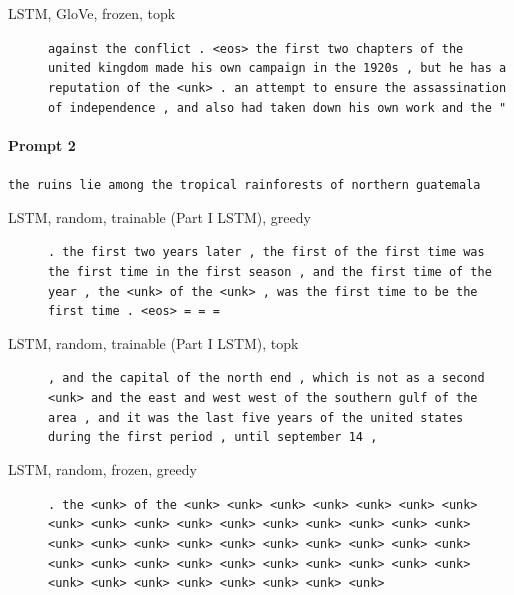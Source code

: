 \begin{description}
\item[LSTM, GloVe, frozen, topk] \texttt{\small against the conflict . \textless{}eos\textgreater{} the first two chapters of the united kingdom made his own campaign in the 1920s , but he has a reputation of the \textless{}unk\textgreater{} . an attempt to ensure the assassination of independence , and also had taken down his own work and the "}
\end{description}
\paragraph{Prompt 2} \texttt{the ruins lie among the tropical rainforests of northern guatemala}
\begin{description}
\item[LSTM, random, trainable (Part I LSTM), greedy] \texttt{\small . the first two years later , the first of the first time was the first time in the first season , and the first time of the year , the \textless{}unk\textgreater{} of the \textless{}unk\textgreater{} , was the first time to be the first time . \textless{}eos\textgreater{} = = =}
\item[LSTM, random, trainable (Part I LSTM), topk] \texttt{\small , and the capital of the north end , which is not as a second \textless{}unk\textgreater{} and the east and west west of the southern gulf of the area , and it was the last five years of the united states during the first period , until september 14 ,}
\item[LSTM, random, frozen, greedy] \texttt{\small . the \textless{}unk\textgreater{} of the \textless{}unk\textgreater{} \textless{}unk\textgreater{} \textless{}unk\textgreater{} \textless{}unk\textgreater{} \textless{}unk\textgreater{} \textless{}unk\textgreater{} \textless{}unk\textgreater{} \textless{}unk\textgreater{} \textless{}unk\textgreater{} \textless{}unk\textgreater{} \textless{}unk\textgreater{} \textless{}unk\textgreater{} \textless{}unk\textgreater{} \textless{}unk\textgreater{} \textless{}unk\textgreater{} \textless{}unk\textgreater{} \textless{}unk\textgreater{} \textless{}unk\textgreater{} \textless{}unk\textgreater{} \textless{}unk\textgreater{} \textless{}unk\textgreater{} \textless{}unk\textgreater{} \textless{}unk\textgreater{} \textless{}unk\textgreater{} \textless{}unk\textgreater{} \textless{}unk\textgreater{} \textless{}unk\textgreater{} \textless{}unk\textgreater{} \textless{}unk\textgreater{} \textless{}unk\textgreater{} \textless{}unk\textgreater{} \textless{}unk\textgreater{} \textless{}unk\textgreater{} \textless{}unk\textgreater{} \textless{}unk\textgreater{} \textless{}unk\textgreater{} \textless{}unk\textgreater{} \textless{}unk\textgreater{} \textless{}unk\textgreater{} \textless{}unk\textgreater{} \textless{}unk\textgreater{} \textless{}unk\textgreater{} \textless{}unk\textgreater{} \textless{}unk\textgreater{} \textless{}unk\textgreater{}}

\end{description}

